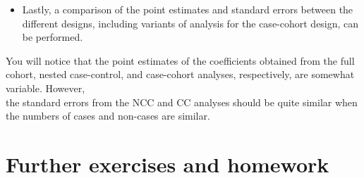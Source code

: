 \documentclass[
]{book}
\newenvironment{Shaded}{\begin{snugshade}}{\end{snugshade}}
\newcommand{\DecValTok}[1]{\textcolor[rgb]{0.00,0.00,0.81}{#1}}
\newcommand{\FunctionTok}[1]{\textcolor[rgb]{0.13,0.29,0.53}{\textbf{#1}}}
\newcommand{\NormalTok}[1]{#1}
\newcommand{\OtherTok}[1]{\textcolor[rgb]{0.56,0.35,0.01}{#1}}
\newcommand{\SpecialCharTok}[1]{\textcolor[rgb]{0.81,0.36,0.00}{\textbf{#1}}}
\newcommand{\StringTok}[1]{\textcolor[rgb]{0.31,0.60,0.02}{#1}}
\providecommand{\tightlist}{%
  \setlength{\itemsep}{0pt}\setlength{\parskip}{0pt}}
\begin{document}
\begin{itemize}
\tightlist
\item
  Lastly, a comparison of the point estimates and standard errors between
  the different designs, including variants of analysis for the case-cohort design, can be performed.
\end{itemize}

\begin{Shaded}
\end{Shaded}

You will notice that the point estimates of the coefficients
obtained from the full cohort, nested case-control, and case-cohort analyses,
respectively, are somewhat variable. However,\\
the standard errors from the NCC and CC
analyses should be quite similar when the numbers of cases and non-cases are similar.

\section{Further exercises and homework}\label{further-exercises-and-homework}
\end{document}
